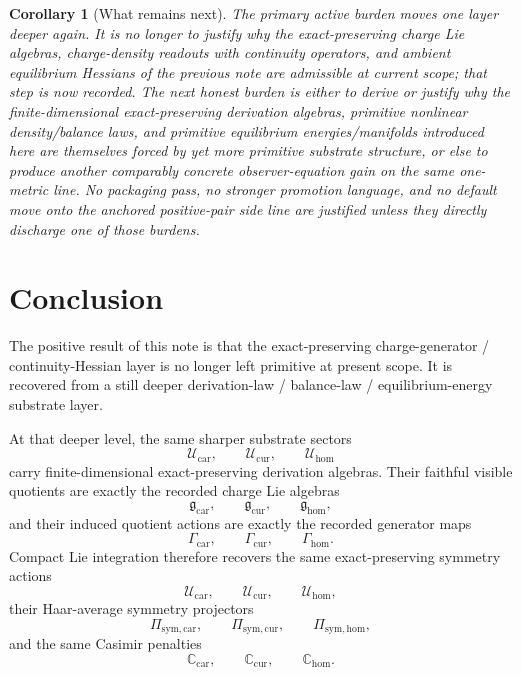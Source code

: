 \documentclass[11pt]{article}
\newcommand{\RootTensorClass}{\mathscr U_{\mathrm{car}}}
\newcommand{\RootRelabelClass}{\mathscr U_{\mathrm{cur}}}
\newcommand{\RootFreeClass}{\mathscr U_{\mathrm{hom}}}
\newcommand{\TensorSymProj}{\Pi_{\mathrm{sym,car}}}
\newcommand{\CurSymProj}{\Pi_{\mathrm{sym,cur}}}
\newcommand{\HomSymProj}{\Pi_{\mathrm{sym,hom}}}
\newcommand{\TensorSymAct}{\mathscr U_{\mathrm{car}}}
\newcommand{\CurSymAct}{\mathscr U_{\mathrm{cur}}}
\newcommand{\HomSymAct}{\mathscr U_{\mathrm{hom}}}
\newcommand{\TensorChargeAlg}{\mathfrak g_{\mathrm{car}}}
\newcommand{\CurChargeAlg}{\mathfrak g_{\mathrm{cur}}}
\newcommand{\HomChargeAlg}{\mathfrak g_{\mathrm{hom}}}
\newcommand{\TensorGen}{\Gamma_{\mathrm{car}}}
\newcommand{\CurGen}{\Gamma_{\mathrm{cur}}}
\newcommand{\HomGen}{\Gamma_{\mathrm{hom}}}
\newcommand{\TensorCasimir}{\mathbb C_{\mathrm{car}}}
\newcommand{\CurCasimir}{\mathbb C_{\mathrm{cur}}}
\newcommand{\HomCasimir}{\mathbb C_{\mathrm{hom}}}
\newtheorem{corollary}{Corollary}
\begin{document}
\begin{corollary}[What remains next]
\label{cor:what_next}
The primary active burden moves one layer deeper again. It is no longer to justify why the exact-preserving charge Lie algebras, charge-density readouts with continuity operators, and ambient equilibrium Hessians of the previous note are admissible at current scope; that step is now recorded. The next honest burden is either to derive or justify why the finite-dimensional exact-preserving derivation algebras, primitive nonlinear density/balance laws, and primitive equilibrium energies/manifolds introduced here are themselves forced by yet more primitive substrate structure, or else to produce another comparably concrete observer-equation gain on the same one-metric line. No packaging pass, no stronger promotion language, and no default move onto the anchored positive-pair side line are justified unless they directly discharge one of those burdens.
\end{corollary}

\section{Conclusion}

The positive result of this note is that the exact-preserving charge-generator / continuity-Hessian layer is no longer left primitive at present scope. It is recovered from a still deeper derivation-law / balance-law / equilibrium-energy substrate layer.

At that deeper level, the same sharper substrate sectors
\[
\RootTensorClass,\qquad
\RootRelabelClass,\qquad
\RootFreeClass
\]
carry finite-dimensional exact-preserving derivation algebras. Their faithful visible quotients are exactly the recorded charge Lie algebras
\[
\TensorChargeAlg,\qquad
\CurChargeAlg,\qquad
\HomChargeAlg,
\]
and their induced quotient actions are exactly the recorded generator maps
\[
\TensorGen,\qquad
\CurGen,\qquad
\HomGen.
\]
Compact Lie integration therefore recovers the same exact-preserving symmetry actions
\[
\TensorSymAct,\qquad
\CurSymAct,\qquad
\HomSymAct,
\]
their Haar-average symmetry projectors
\[
\TensorSymProj,\qquad
\CurSymProj,\qquad
\HomSymProj,
\]
and the same Casimir penalties
\[
\TensorCasimir,\qquad
\CurCasimir,\qquad
\HomCasimir.
\]
\end{document}
